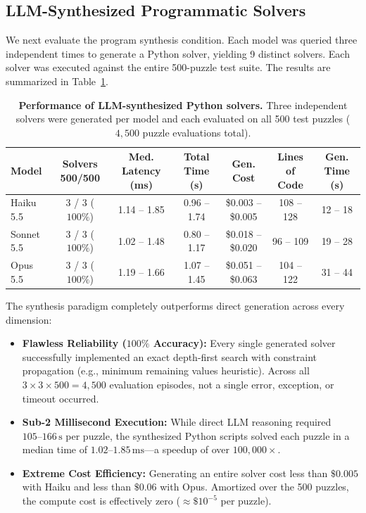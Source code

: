\documentclass{article} %
\begin{document}
\subsection{LLM-Synthesized Programmatic Solvers}

We next evaluate the program synthesis condition. Each model was queried three independent times to generate a Python solver, yielding 9 distinct solvers. Each solver was executed against the entire 500-puzzle test suite. The results are summarized in Table~\ref{tab:llm_code}.

\begin{table}[t]
\centering
\small
\caption{\textbf{Performance of LLM-synthesized Python solvers.} Three independent solvers were generated per model and each evaluated on all 500 test puzzles ($4{,}500$ puzzle evaluations total).}
\label{tab:llm_code}
\begin{tabular}{lcccccc}
\toprule
\textbf{Model} & \textbf{Solvers 500/500} & \textbf{Med. Latency (ms)} & \textbf{Total Time (s)} & \textbf{Gen. Cost} & \textbf{Lines of Code} & \textbf{Gen. Time (s)} \\
\midrule
Haiku 5.5  & 3 / 3 ($100\%$) & 1.14 -- 1.85 & 0.96 -- 1.74 & \$0.003 -- \$0.005 & 108 -- 128 & 12 -- 18 \\
Sonnet 5.5 & 3 / 3 ($100\%$) & 1.02 -- 1.48 & 0.80 -- 1.17 & \$0.018 -- \$0.020 & 96 -- 109  & 19 -- 28 \\
Opus 5.5   & 3 / 3 ($100\%$) & 1.19 -- 1.66 & 1.07 -- 1.45 & \$0.051 -- \$0.063 & 104 -- 122 & 31 -- 44 \\
\bottomrule
\end{tabular}
\end{table}

The synthesis paradigm completely outperforms direct generation across every dimension:
\begin{itemize}
    \item \textbf{Flawless Reliability ($100\%$ Accuracy):} Every single generated solver successfully implemented an exact depth-first search with constraint propagation (e.g., minimum remaining values heuristic). Across all $3 \times 3 \times 500 = 4{,}500$ evaluation episodes, not a single error, exception, or timeout occurred.
    \item \textbf{Sub-2 Millisecond Execution:} While direct LLM reasoning required $105\text{--}166\,\mathrm{s}$ per puzzle, the synthesized Python scripts solved each puzzle in a median time of $1.02\text{--}1.85\,\mathrm{ms}$---a speedup of over $100{,}000\times$.
    \item \textbf{Extreme Cost Efficiency:} Generating an entire solver cost less than $\$0.005$ with Haiku and less than $\$0.06$ with Opus. Amortized over the 500 puzzles, the compute cost is effectively zero ($\approx \$10^{-5}$ per puzzle).
\end{itemize}
\end{document}
